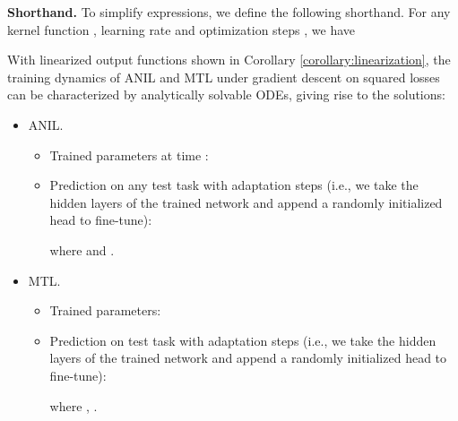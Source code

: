 \documentclass{article}
\begin{document}
\textbf{Shorthand.} To simplify expressions, we define the following shorthand. For any kernel function , learning rate  and optimization steps , we have


\begin{lemma}\label{lemma:lienarization}
With linearized output functions shown in Corollary \ref{corollary:linearization}, the training dynamics of ANIL and MTL under gradient descent on squared losses can be characterized by analytically solvable ODEs, giving rise to the solutions:
\begin{itemize}[leftmargin=*,align=left,noitemsep,nolistsep]
    \item ANIL.
    \begin{itemize}[leftmargin=*,align=left,noitemsep,nolistsep]
        \item Trained parameters at time :
        
\item Prediction on any test task  with adaptation steps  (i.e., we take the hidden layers of the trained network  and append a randomly initialized head  to fine-tune):
        
        where  and .
    \end{itemize}
    \item MTL.
    \begin{itemize}[leftmargin=*,align=left,noitemsep,nolistsep]
        \item Trained parameters:
        
\item Prediction on test task  with adaptation steps  (i.e., we take the hidden layers of the trained network  and append a randomly initialized head  to fine-tune):
        
        where , .
    \end{itemize}
\end{itemize}
\end{lemma}
\end{document}
